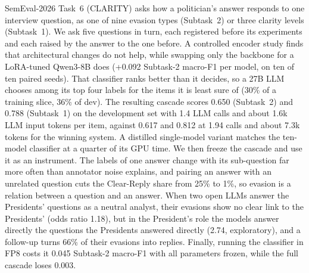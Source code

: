 SemEval-2026 Task~6 (CLARITY) asks how a politician's answer responds to one interview question, as one of nine evasion types (Subtask~2) or three clarity levels (Subtask~1).
We ask five questions in turn, each registered before its experiments and each raised by the answer to the one before.
A controlled encoder study finds that architectural changes do not help, while swapping only the backbone for a LoRA-tuned Qwen3-8B does (+0.092 Subtask-2 macro-F1 per model, on ten of ten paired seeds).
That classifier ranks better than it decides, so a 27B LLM chooses among its top four labels for the items it is least sure of (30\% of a training slice, 36\% of dev).
The resulting cascade scores 0.650 (Subtask~2) and 0.788 (Subtask~1) on the development set with 1.4 LLM calls and about 1.6k LLM input tokens per item, against 0.617 and 0.812 at 1.94 calls and about 7.3k tokens for the winning system.
A distilled single-model variant matches the ten-model classifier at a quarter of its GPU time.
We then freeze the cascade and use it as an instrument.
The labels of one answer change with its sub-question far more often than annotator noise explains, and pairing an answer with an unrelated question cuts the Clear-Reply share from 25\% to 1\%, so evasion is a relation between a question and an answer.
When two open LLMs answer the Presidents' questions as a neutral analyst, their evasions show no clear link to the Presidents' (odds ratio 1.18), but in the President's role the models answer directly the questions the Presidents answered directly (2.74, exploratory), and a follow-up turns 66\% of their evasions into replies.
Finally, running the classifier in FP8 costs it 0.045 Subtask-2 macro-F1 with all parameters frozen, while the full cascade loses 0.003.
